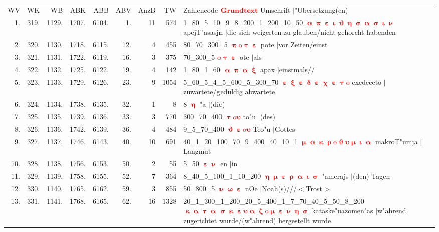 \documentclass[a4paper,10pt,landscape]{article}
\begin{document}
\begin{tabular}{rrrrrrrrp{120mm}}
WV&WK&WB&ABK&ABB&ABV&AnzB&TW&Zahlencode \textcolor{red}{$\boldsymbol{Grundtext}$} Umschrift $|$"Ubersetzung(en)\\
1.&319.&1129.&1707.&6104.&1.&11&574&1\_80\_5\_10\_9\_8\_200\_1\_200\_10\_50 \textcolor{red}{$\boldsymbol{\upalpha\uppi\upepsilon\upiota\upvartheta\upeta\upsigma\upalpha\upsigma\upiota\upnu}$} apejT"asasjn $|$die sich weigerten zu glauben/nicht gehorcht habenden\\
2.&320.&1130.&1718.&6115.&12.&4&455&80\_70\_300\_5 \textcolor{red}{$\boldsymbol{\uppi\mathrm{o}\uptau\upepsilon}$} pote $|$vor Zeiten/einst\\
3.&321.&1131.&1722.&6119.&16.&3&375&70\_300\_5 \textcolor{red}{$\boldsymbol{\mathrm{o}\uptau\upepsilon}$} ote $|$als\\
4.&322.&1132.&1725.&6122.&19.&4&142&1\_80\_1\_60 \textcolor{red}{$\boldsymbol{\upalpha\uppi\upalpha\upxi}$} apax $|$einstmals//\\
5.&323.&1133.&1729.&6126.&23.&9&1054&5\_60\_5\_4\_5\_600\_5\_300\_70 \textcolor{red}{$\boldsymbol{\upepsilon\upxi\upepsilon\updelta\upepsilon\upchi\upepsilon\uptau\mathrm{o}}$} exedeceto $|$zuwartete/geduldig abwartete\\
6.&324.&1134.&1738.&6135.&32.&1&8&8 \textcolor{red}{$\boldsymbol{\upeta}$} "a $|$(die)\\
7.&325.&1135.&1739.&6136.&33.&3&770&300\_70\_400 \textcolor{red}{$\boldsymbol{\uptau\mathrm{o}\upsilon}$} to"u $|$(des)\\
8.&326.&1136.&1742.&6139.&36.&4&484&9\_5\_70\_400 \textcolor{red}{$\boldsymbol{\upvartheta\upepsilon\mathrm{o}\upsilon}$} Teo"u $|$Gottes\\
9.&327.&1137.&1746.&6143.&40.&10&691&40\_1\_20\_100\_70\_9\_400\_40\_10\_1 \textcolor{red}{$\boldsymbol{\upmu\upalpha\upkappa\uprho\mathrm{o}\upvartheta\upsilon\upmu\upiota\upalpha}$} makroT"umja $|$Langmut\\
10.&328.&1138.&1756.&6153.&50.&2&55&5\_50 \textcolor{red}{$\boldsymbol{\upepsilon\upnu}$} en $|$in\\
11.&329.&1139.&1758.&6155.&52.&7&364&8\_40\_5\_100\_1\_10\_200 \textcolor{red}{$\boldsymbol{\upeta\upmu\upepsilon\uprho\upalpha\upiota\upsigma}$} "amerajs $|$(den) Tagen\\
12.&330.&1140.&1765.&6162.&59.&3&855&50\_800\_5 \textcolor{red}{$\boldsymbol{\upnu\upomega\upepsilon}$} nOe $|$Noah(s)///$<$Trost$>$\\
13.&331.&1141.&1768.&6165.&62.&16&1328&20\_1\_300\_1\_200\_20\_5\_400\_1\_7\_70\_40\_5\_50\_8\_200 \textcolor{red}{$\boldsymbol{\upkappa\upalpha\uptau\upalpha\upsigma\upkappa\upepsilon\upsilon\upalpha\upzeta\mathrm{o}\upmu\upepsilon\upnu\upeta\upsigma}$} kataske"uazomen"as $|$w"ahrend zugerichtet wurde/(w"ahrend) hergestellt wurde\\

\end{tabular}
\end{document}
